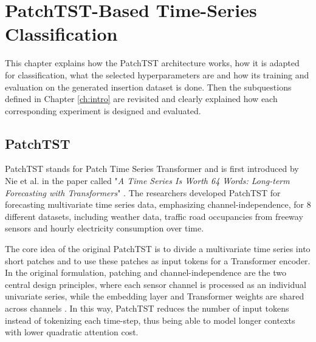 \chapter{PatchTST-Based Time-Series Classification}\label{ch:methodology}
This chapter explains how the PatchTST architecture works, how it is adapted for classification, what the selected hyperparameters are and how its training and evaluation on the generated insertion dataset is done. Then the subquestions defined in Chapter \ref{ch:intro} are revisited and clearly explained how each corresponding experiment is designed and evaluated.

\section{PatchTST}\label{sec:patchtst}
PatchTST stands for Patch Time Series Transformer and is first introduced by Nie et al. in the paper called "\textit{A Time Series Is Worth 64 Words: Long-term Forecasting with Transformers}" \cite{nieTimeSeriesWorth2023b}. The researchers developed PatchTST for forecasting multivariate time series data, emphasizing channel-independence, for 8 different datasets, including weather data, traffic road occupancies from freeway sensors and hourly electricity consumption over time.

The core idea of the original PatchTST is to divide a multivariate time series into short patches and to use these patches as input tokens for a Transformer encoder. In the original formulation, patching and channel-independence are the two central design principles, where each sensor channel is processed as an individual univariate series, while the embedding layer and Transformer weights are shared across channels \cite{nieTimeSeriesWorth2023b}. In this way, PatchTST reduces the number of input tokens instead of tokenizing each time-step, thus being able to model longer contexts with lower quadratic attention cost.

